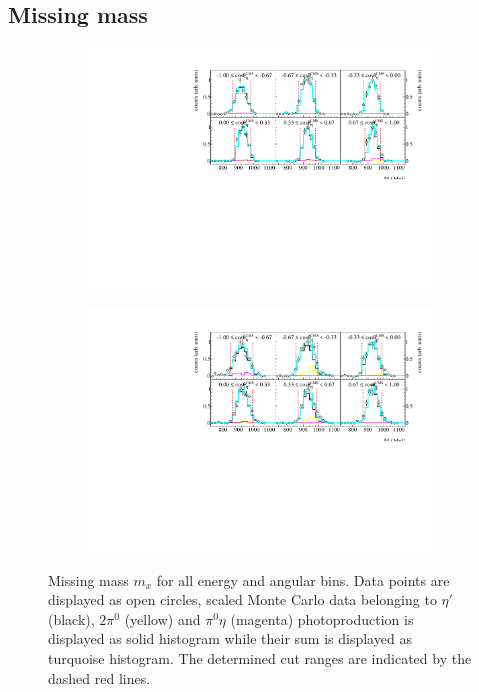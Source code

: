 \subsection{Missing mass}
\begin{figure}[H]
	\centering
	\begin{subfigure}{\linewidth}
		\includegraphics[width=\linewidth]{../figs/hydrogen/bin_cuts/mismcut_ebin1.pdf}
	\end{subfigure}
	
	\begin{subfigure}{\linewidth}
		\includegraphics[width=\linewidth]{../figs/hydrogen/bin_cuts/mismcut_ebin2.pdf}
	\end{subfigure}
\caption{Missing mass $m_x$ for all energy and angular bins. Data points are displayed as open circles, scaled Monte Carlo data belonging to $\eta'$ (black), $2\pi^0$ (yellow) and $\pi^0\eta$ (magenta) photoproduction is displayed as solid histogram while their sum is displayed as turquoise histogram. The determined cut ranges are indicated by the dashed red lines.}
\end{figure}

